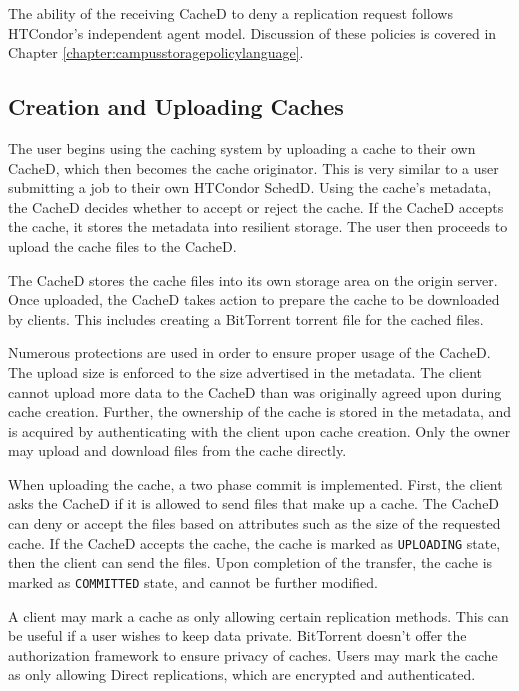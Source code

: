 The ability of the receiving CacheD to deny a replication request follows HTCondor's independent agent model.  Discussion of these policies is covered in Chapter \ref{chapter:campusstoragepolicylanguage}.





\subsection{Creation and Uploading Caches}
The user begins using the caching system by uploading a cache to their own CacheD, which then becomes the cache originator.  This is very similar to a user submitting a job to their own HTCondor SchedD.  Using the cache's metadata, the CacheD decides whether to accept or reject the cache.  If the CacheD accepts the cache, it stores the metadata into resilient storage.  The user then proceeds to upload the cache files to the CacheD.

The CacheD stores the cache files into its own storage area on the origin server.  Once uploaded, the CacheD takes action to prepare the cache to be downloaded by clients.  This includes creating a BitTorrent torrent file for the cached files.  

Numerous protections are used in order to ensure proper usage of the CacheD.  The upload size is enforced to the size advertised in the metadata.  The client cannot upload more data to the CacheD than was originally agreed upon during cache creation.  Further, the ownership of the cache is stored in the metadata, and is acquired by authenticating with the client upon cache creation.  Only the owner may upload and download files from the cache directly.

When uploading the cache, a two phase commit is implemented.  First, the client asks the CacheD if it is allowed to send files that make up a cache.  The CacheD can deny or accept the files based on attributes such as the size of the requested cache.  If the CacheD accepts the cache, the cache is marked as \texttt{UPLOADING} state, then the client can send the files.  Upon completion of the transfer, the cache is marked as \texttt{COMMITTED} state, and cannot be further modified.

A client may mark a cache as only allowing certain replication methods.  This can be useful if a user wishes to keep data private. BitTorrent doesn't offer the authorization framework to ensure privacy of caches. Users may mark the cache as only allowing Direct replications, which are encrypted and authenticated.

